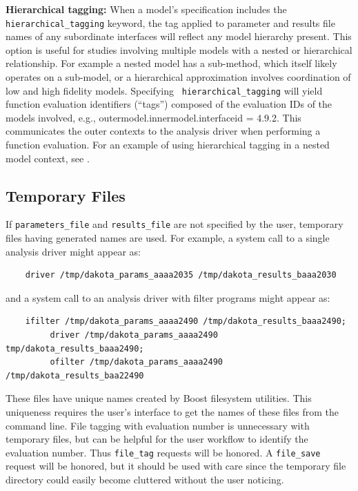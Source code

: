 \textbf{Hierarchical tagging:} When a model's specification includes
the {\tt hierarchical\_tagging} keyword, the tag applied to parameter
and results file names of any subordinate interfaces will reflect any
model hierarchy present.  This option is useful for studies involving
multiple models with a nested or hierarchical relationship.  For
example a nested model has a sub-method, which itself likely operates
on a sub-model, or a hierarchical approximation involves coordination
of low and high fidelity models.  Specifying {\tt
hierarchical\_tagging} will yield function evaluation identifiers
(``tags'') composed of the evaluation IDs of the models involved,
e.g., outermodel.innermodel.interfaceid = 4.9.2.  This communicates
the outer contexts to the analysis driver when performing a function
evaluation.  For an example of using hierarchical tagging in a nested
model context,
see .

\subsection{Temporary Files}\label{interfaces:file:temporary}

If \texttt{parameters\_file} and \texttt{results\_file} are not
specified by the user, temporary files having generated names are
used.  For example, a system call to a single analysis driver might
appear as:
\begin{small}
\begin{verbatim}
    driver /tmp/dakota_params_aaaa2035 /tmp/dakota_results_baaa2030
\end{verbatim}
\end{small}

and a system call to an analysis driver with filter programs might appear as:
\begin{small}
\begin{verbatim}
    ifilter /tmp/dakota_params_aaaa2490 /tmp/dakota_results_baaa2490;
         driver /tmp/dakota_params_aaaa2490 tmp/dakota_results_baaa2490;
         ofilter /tmp/dakota_params_aaaa2490 /tmp/dakota_results_baa22490
\end{verbatim}
\end{small}

These files have unique names created by Boost filesystem
utilities. This uniqueness requires the user's interface to get the
names of these files from the command line. File tagging with
evaluation number is unnecessary with temporary files, but can be
helpful for the user workflow to identify the evaluation number.  Thus
\texttt{file\_tag} requests will be honored. A \texttt{file\_save}
request will be honored, but it should be used with care since the
temporary file directory could easily become cluttered without the
user noticing.

